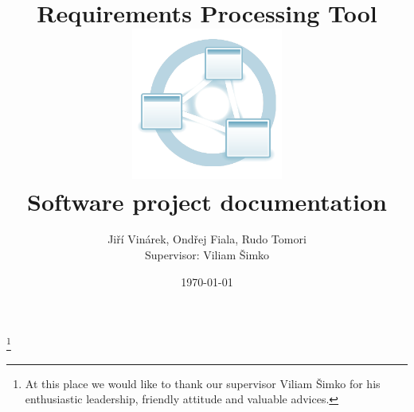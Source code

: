 \documentclass[12pt,a4paper]{article}
\title{
  \textbf{Requirements Processing Tool}\\
  \vspace{26pt}\includegraphics[height=5cm]{images/reprotool-logo}\\
  \vspace{16pt}\textbf{Software project documentation}
}
\author{
  Jiří Vinárek,
  Ondřej Fiala,
  Rudo Tomori
  \vspace*{120pt}
  \\Supervisor: Viliam Šimko
}
\date{\small{\today}}
\begin{document}
\maketitle
\thispagestyle{empty} %

\newpage

\thanks{At this place we would like to thank our supervisor Viliam Šimko for his enthusiastic leadership, friendly attitude and valuable advices.}

\newpage

\tableofcontents
\vspace{12pt}

  
  
  
  
  
  
  
    
  \appendix
  
%  



\end{document}
